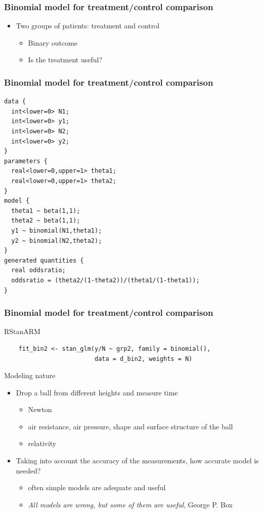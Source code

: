 \documentclass[10pt,handout]{beamer}
\begin{document}
\begin{frame}[fragile]
  \frametitle{Binomial model for treatment/control comparison}

  \begin{itemize}
  \item Two groups of patients: treatment and control
    \begin{itemize}
    \item Binary outcome
    \item Is the treatment useful?
    \end{itemize}
  \end{itemize}

\end{frame}

\begin{frame}[fragile]
  \frametitle{Binomial model for treatment/control comparison}
  {\footnotesize
  \begin{lstlisting}
data {
  int<lower=0> N1;
  int<lower=0> y1;
  int<lower=0> N2;
  int<lower=0> y2;
}
parameters {
  real<lower=0,upper=1> theta1;
  real<lower=0,upper=1> theta2;
}
model {
  theta1 ~ beta(1,1);
  theta2 ~ beta(1,1);
  y1 ~ binomial(N1,theta1);
  y2 ~ binomial(N2,theta2);
}
generated quantities {
  real oddsratio;
  oddsratio = (theta2/(1-theta2))/(theta1/(1-theta1));
}
  \end{lstlisting}
}
\end{frame}

\begin{frame}[fragile]
  \frametitle{Binomial model for treatment/control comparison}

  RStanARM
  {\scriptsize
  \begin{lstlisting}
    fit_bin2 <- stan_glm(y/N ~ grp2, family = binomial(),
                         data = d_bin2, weights = N)
  \end{lstlisting}
}
\end{frame}

\begin{frame}{Modeling nature}

  \begin{itemize}
  \item Drop a ball from different heights and measure time
    \pause
    \begin{itemize}
    \item Newton
    \item air resistance, air pressure, shape and surface structure of the ball
    \item relativity
    \end{itemize}
    \pause
  \item Taking into account the accuracy of the measurements, how
    accurate model is needed?
    \pause
    \begin{itemize}
    \item often simple models are adequate and useful
    \item \emph{All models are wrong, but some of them are useful},
      George P. Box
    \end{itemize}
  \end{itemize}

\end{frame}
\end{document}
